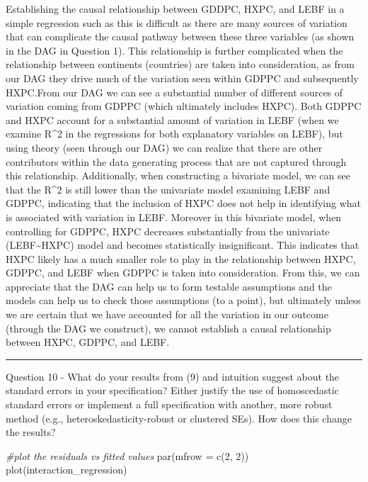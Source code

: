 \documentclass[
]{article}
\newenvironment{Shaded}{\begin{snugshade}}{\end{snugshade}}
\newcommand{\AttributeTok}[1]{\textcolor[rgb]{0.77,0.63,0.00}{#1}}
\newcommand{\CommentTok}[1]{\textcolor[rgb]{0.56,0.35,0.01}{\textit{#1}}}
\newcommand{\DecValTok}[1]{\textcolor[rgb]{0.00,0.00,0.81}{#1}}
\newcommand{\FunctionTok}[1]{\textcolor[rgb]{0.00,0.00,0.00}{#1}}
\newcommand{\NormalTok}[1]{#1}
\begin{document}
Establishing the causal relationship between GDDPC, HXPC, and LEBF in a
simple regression such as this is difficult as there are many sources of
variation that can complicate the causal pathway between these three
variables (as shown in the DAG in Question 1). This relationship is
further complicated when the relationship between continents (countries)
are taken into consideration, as from our DAG they drive much of the
variation seen within GDPPC and subsequently HXPC.From our DAG we can
see a substantial number of different sources of variation coming from
GDPPC (which ultimately includes HXPC). Both GDPPC and HXPC account for
a substantial amount of variation in LEBF (when we examine R\^{}2 in the
regressions for both explanatory variables on LEBF), but using theory
(seen through our DAG) we can realize that there are other contributors
within the data generating process that are not captured through this
relationship. Additionally, when constructing a bivariate model, we can
see that the R\^{}2 is still lower than the univariate model examining
LEBF and GDPPC, indicating that the inclusion of HXPC does not help in
identifying what is associated with variation in LEBF. Moreover in this
bivariate model, when controlling for GDPPC, HXPC decreases
substantially from the univariate (LEBF\textasciitilde HXPC) model and
becomes statistically insignificant. This indicates that HXPC likely has
a much smaller role to play in the relationship between HXPC, GDPPC, and
LEBF when GDPPC is taken into consideration. From this, we can
appreciate that the DAG can help us to form testable assumptions and the
models can help us to check those assumptions (to a point), but
ultimately unless we are certain that we have accounted for all the
variation in our outcome (through the DAG we construct), we cannot
establish a causal relationship between HXPC, GDPPC, and LEBF.

\begin{center}\rule{0.5\linewidth}{0.5pt}\end{center}

Question 10 - What do your results from (9) and intuition suggest about
the standard errors in your specification? Either justify the use of
homoscedastic standard errors or implement a full specification with
another, more robust method (e.g., heteroskedasticity-robust or
clustered SEs). How does this change the results?

\begin{Shaded}
\begin{Highlighting}[]
\CommentTok{\#plot the residuals vs fitted values}
\FunctionTok{par}\NormalTok{(}\AttributeTok{mfrow =} \FunctionTok{c}\NormalTok{(}\DecValTok{2}\NormalTok{, }\DecValTok{2}\NormalTok{))}
\FunctionTok{plot}\NormalTok{(interaction\_regression)}
\end{Highlighting}
\end{Shaded}
\end{document}
